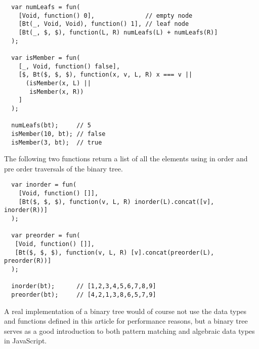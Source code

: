 \begin{verbatim}
  var numLeafs = fun(
    [Void, function() 0],              // empty node
    [Bt(_, Void, Void), function() 1], // leaf node
    [Bt(_, $, $), function(L, R) numLeafs(L) + numLeafs(R)]
  );

  var isMember = fun(
    [_, Void, function() false],
    [$, Bt($, $, $), function(x, v, L, R) x === v || 
	  (isMember(x, L) || 
       isMember(x, R))
    ]
  );

  numLeafs(bt);     // 5
  isMember(10, bt); // false
  isMember(3, bt);  // true
\end{verbatim}
The following two functions return a list of all the elements using in order and pre order traversals of the binary tree.
\begin{verbatim}
  var inorder = fun(
    [Void, function() []],
    [Bt($, $, $), function(v, L, R) inorder(L).concat([v], inorder(R))]
  );

  var preorder = fun(
   [Void, function() []],
   [Bt($, $, $), function(v, L, R) [v].concat(preorder(L), preorder(R))]
  );

  inorder(bt);      // [1,2,3,4,5,6,7,8,9]
  preorder(bt);     // [4,2,1,3,8,6,5,7,9]
\end{verbatim}
A real implementation of a binary tree would of course not use the data types and functions defined in this article for performance reasons, but a binary tree serves as a good introduction to both pattern matching and algebraic data types in JavaScript.

